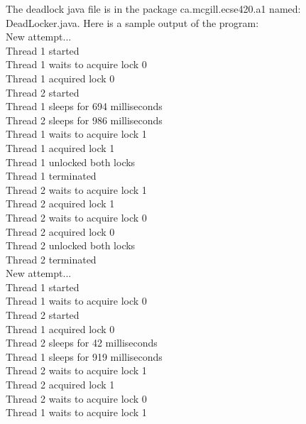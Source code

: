 \documentclass[11pt,letterpaper]{exam}
\begin{document}
\begin{questions}
		\question
			The deadlock java file is in the package ca.mcgill.ecse420.a1 named: DeadLocker.java.
			Here is a sample output of the program:\\
			New attempt...\\
			Thread 1 started\\
			Thread 1 waits to acquire lock 0\\
			Thread 1 acquired lock 0\\
			Thread 2 started\\
			Thread 1 sleeps for 694 milliseconds\\
			Thread 2 sleeps for 986 milliseconds\\
			Thread 1 waits to acquire lock 1\\
			Thread 1 acquired lock 1\\
			Thread 1 unlocked both locks\\
			Thread 1 terminated\\
			Thread 2 waits to acquire lock 1\\
			Thread 2 acquired lock 1\\
			Thread 2 waits to acquire lock 0\\
			Thread 2 acquired lock 0\\
			Thread 2 unlocked both locks\\
			Thread 2 terminated\\
			New attempt...\\
			Thread 1 started\\
			Thread 1 waits to acquire lock 0\\
			Thread 2 started\\
			Thread 1 acquired lock 0\\
			Thread 2 sleeps for 42 milliseconds\\
			Thread 1 sleeps for 919 milliseconds\\
			Thread 2 waits to acquire lock 1\\
			Thread 2 acquired lock 1\\
			Thread 2 waits to acquire lock 0\\
			Thread 1 waits to acquire lock 1\\
\end{questions}
\end{document}
